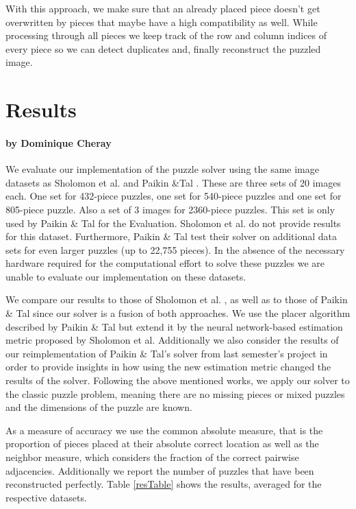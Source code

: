 \documentclass[11pt]{report}
\begin{document}
With this approach, we make sure that an already placed piece doesn't get overwritten by pieces that maybe have a high compatibility as well. While processing through all pieces we keep track of the row and column indices of every piece so we can detect duplicates and, finally reconstruct the puzzled image.


\chapter{Results}
\subsubsection*{by Dominique Cheray}

We evaluate our implementation of the puzzle solver using the same image
datasets as Sholomon et al. \cite{sholomon2016dnn} and Paikin \&Tal
\cite{Paikin2015}. These are three sets of 20 images each. One set for 432-piece
puzzles, one set for 540-piece puzzles and one set for 805-piece puzzle. Also a
set of 3 images for 2360-piece puzzles. This set is only used by Paikin \& Tal
for the Evaluation. Sholomon et al. do not provide results for this dataset.
Furthermore, Paikin \& Tal test their solver on additional data sets for even
larger puzzles (up to 22,755 pieces). In the absence of the necessary hardware
required for the computational effort to solve these puzzles we are unable to
evaluate our implementation on these datasets.

We compare our results to those of Sholomon et al. \cite{sholomon2016dnn}, as
well as to those of Paikin \& Tal \cite{Paikin2015} since our solver is a fusion
of both approaches. We use the placer algorithm described by Paikin \& Tal but
extend it by the neural network-based estimation metric proposed by Sholomon et
al. Additionally we also consider the results of our reimplementation of Paikin
\& Tal's solver from last semester's project in order to provide insights in how
using the new estimation metric changed the results of the solver. Following the
above mentioned works, we apply our
solver to the classic puzzle problem, meaning there are no missing pieces or
mixed puzzles and the dimensions of the puzzle are known.

As a measure of accuracy we use the common absolute measure, that is the
proportion of pieces placed at their absolute correct location as well as the
neighbor measure, which considers the fraction of the correct pairwise
adjacencies. Additionally we report the number of puzzles that have been
reconstructed perfectly. Table \ref{resTable} shows the results, averaged for
the respective datasets.
\end{document}
